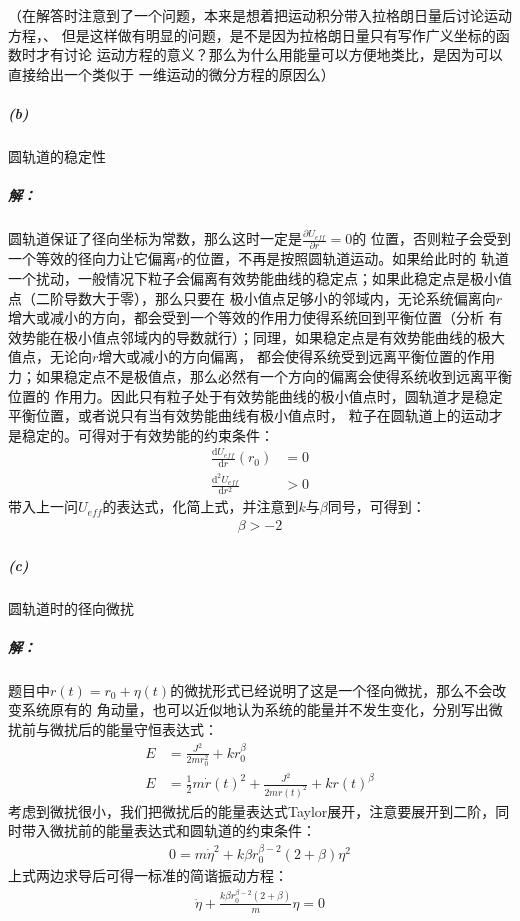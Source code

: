 \documentclass[a4paper]{ctexart}
\def\d{\mathrm{d}}
\begin{document}
    （在解答时注意到了一个问题，本来是想着把运动积分带入拉格朗日量后讨论运动方程，、
    但是这样做有明显的问题，是不是因为拉格朗日量只有写作广义坐标的函数时才有讨论
    运动方程的意义？那么为什么用能量可以方便地类比，是因为可以直接给出一个类似于
    一维运动的微分方程的原因么）
    \subparagraph{(b)}圆轨道的稳定性
    \subparagraph{解：}
    圆轨道保证了径向坐标为常数，那么这时一定是$\frac{\partial U_{eff}}{\partial r} = 0$的
    位置，否则粒子会受到一个等效的径向力让它偏离$r$的位置，不再是按照圆轨道运动。如果给此时的
    轨道一个扰动，一般情况下粒子会偏离有效势能曲线的稳定点；如果此稳定点是极小值点（二阶导数大于零），那么只要在
    极小值点足够小的邻域内，无论系统偏离向$r$增大或减小的方向，都会受到一个等效的作用力使得系统回到平衡位置（分析
    有效势能在极小值点邻域内的导数就行）；同理，如果稳定点是有效势能曲线的极大值点，无论向$r$增大或减小的方向偏离，
    都会使得系统受到远离平衡位置的作用力；如果稳定点不是极值点，那么必然有一个方向的偏离会使得系统收到远离平衡位置的
    作用力。因此只有粒子处于有效势能曲线的极小值点时，圆轨道才是稳定平衡位置，或者说只有当有效势能曲线有极小值点时，
    粒子在圆轨道上的运动才是稳定的。可得对于有效势能的约束条件：
    \begin{align}
        \frac{\d U_{eff}}{\d r}(r_{0}) &= 0\\
        \frac{\d ^{2} U_{eff}}{\d r^{2}} &> 0
    \end{align}
    带入上一问$U_{eff}$的表达式，化简上式，并注意到$k$与$\beta$同号，可得到：
    \begin{align}
        \beta > -2
    \end{align}
    \subparagraph{(c)}圆轨道时的径向微扰
    \subparagraph{解：}题目中$r(t) = r_{0} + \eta(t)$的微扰形式已经说明了这是一个径向微扰，那么不会改变系统原有的
    角动量，也可以近似地认为系统的能量并不发生变化，分别写出微扰前与微扰后的能量守恒表达式：
    \begin{align}
        E & = \frac{J^{2}}{2mr^{2}_{0}} + kr_{0}^{\beta}\\
        E &= \frac{1}{2}m\dot{r}(t)^{2} + \frac{J^{2}}{2mr(t)^{2}} + kr(t)^{\beta}
    \end{align}
    考虑到微扰很小，我们把微扰后的能量表达式Taylor展开，注意要展开到二阶，同时带入微扰前的能量表达式和圆轨道的约束条件：
    \begin{align}
        0 = m\dot{\eta}^{2} + k\beta r_{0}^{\beta - 2}(2 + \beta)\eta^{2}
    \end{align}
    上式两边求导后可得一标准的简谐振动方程：
    \begin{align}
        \ddot{\eta} + \frac{k\beta r_{0}^{\beta - 2}(2 + \beta)}{m}\eta = 0
    \end{align}
\end{document}
